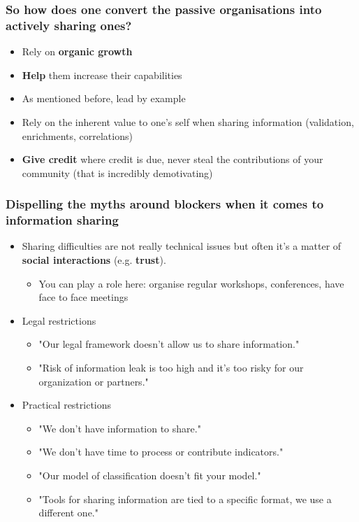 \begin{frame}
\frametitle{So how does one convert the passive organisations into actively sharing ones?}
\begin{itemize}
    \item Rely on {\bf organic growth}
    \item {\bf Help} them increase their capabilities
	\item As mentioned before, lead by example
	\item Rely on the inherent value to one's self when sharing information (validation, enrichments, correlations)
    \item {\bf Give credit} where credit is due, never steal the contributions of your community (that is incredibly demotivating)
\end{itemize}
\end{frame}

\begin{frame}
\frametitle{Dispelling the myths around blockers when it comes to information sharing}
        \begin{itemize}
                \item Sharing difficulties are not really technical issues but often it's a matter of {\bf social interactions} (e.g. {\bf trust}).
		\begin{itemize}
			\item You can play a role here: organise regular workshops, conferences, have face to face meetings
		\end{itemize}
                \item Legal restrictions
                        \begin{itemize}
                                \item "Our legal framework doesn't allow us to share information."
                                \item "Risk of information leak is too high and it's too risky for our organization or partners."
                        \end{itemize}
                \item Practical restrictions
                        \begin{itemize}
                                \item "We don't have information to share."
                                \item "We don't have time to process or contribute indicators."
                                \item "Our model of classification doesn't fit your model."
                                \item "Tools for sharing information are tied to a specific format, we use a different one."
                        \end{itemize}
        \end{itemize}
\end{frame}

